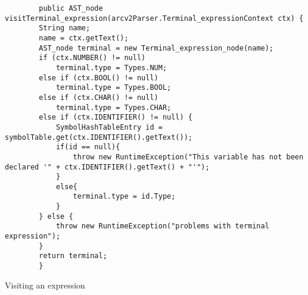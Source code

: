 
\begin{listing}[htb!]
    \begin{verbatim}
        public AST_node visitTerminal_expression(arcv2Parser.Terminal_expressionContext ctx) {
        String name;
        name = ctx.getText();
        AST_node terminal = new Terminal_expression_node(name);
        if (ctx.NUMBER() != null)
            terminal.type = Types.NUM;
        else if (ctx.BOOL() != null)
            terminal.type = Types.BOOL;
        else if (ctx.CHAR() != null)
            terminal.type = Types.CHAR;
        else if (ctx.IDENTIFIER() != null) {
            SymbolHashTableEntry id = symbolTable.get(ctx.IDENTIFIER().getText());
            if(id == null){
                throw new RuntimeException("This variable has not been declared '" + ctx.IDENTIFIER().getText() + "'");
            }
            else{
                terminal.type = id.Type;
            }
        } else {
            throw new RuntimeException("problems with terminal expression");
        }
        return terminal;
        }
    \end{verbatim}
    \caption{Visiting an expression}
    \label{lst:visitorexpression}
\end{listing}





